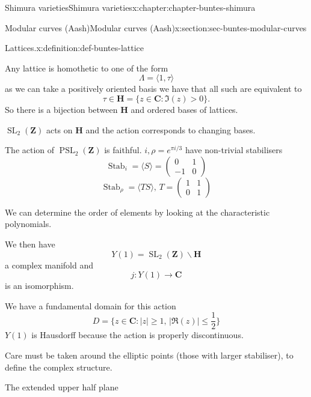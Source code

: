 \documentclass[oneside,10pt,]{book}
\numberwithin{equation}{section}
\newcommand{\ZZ}{\mathbf{Z}}
\newcommand{\CC}{\mathbf{C}}
\newcommand{\HH}{\mathbf{H}}
\DeclareMathOperator{\Stab}{Stab}
\DeclareMathOperator{\SL}{SL}
\DeclareMathOperator{\PSL}{PSL}
\newcommand{\gt}{>}
\newcommand{\amp}{&}
\begin{document}
\begin{chapterptx}{Shimura varieties}{}{Shimura varieties}{}{}{x:chapter:chapter-buntes-shimura}
\begin{sectionptx}{Modular curves (Aash)}{}{Modular curves (Aash)}{}{}{x:section:sec-buntes-modular-curves}
\begin{definition}{Lattices.}{x:definition:def-buntes-lattice}
\end{definition}
Any lattice is homothetic to one of the form%
\begin{equation*}
\Lambda = \langle 1 , \tau \rangle
\end{equation*}
as we can take a positively oriented basis we have that all such are equivalent to%
\begin{equation*}
\tau \in \HH = \{ z\in \CC: \Im(z) \gt 0 \}\text{.}
\end{equation*}
So there is a bijection between \(\HH\) and ordered bases of lattices.%
\par
\(\SL_2(\ZZ)\) acts on \(\HH\) and the action corresponds to changing bases.%
\par
The action of \(\PSL_2(\ZZ)\) is faithful. \(i,\rho = e^{\pi i /3}\) have non-trivial stabilisers%
\begin{equation*}
\Stab_i =  \langle S\rangle = \begin{pmatrix} 0\amp1 \\ -1 \amp 0 \end{pmatrix}
\end{equation*}
%
\begin{equation*}
\Stab_\rho =  \langle TS\rangle,\,T = \begin{pmatrix} 1\amp1 \\ 0 \amp 1 \end{pmatrix}
\end{equation*}
%
\par
We can determine the order of elements by looking at the characteristic polynomials.%
\par
We then have%
\begin{equation*}
Y(1) =\SL_2(\ZZ) \backslash \HH
\end{equation*}
a complex manifold and%
\begin{equation*}
j\colon Y(1) \to \CC
\end{equation*}
is an isomorphism.%
\par
We have a fundamental domain for this action%
\begin{equation*}
D = \{ z\in \CC : |z|  \ge 1,\, |\Re(z)| \le \frac 12 \}
\end{equation*}
\(Y(1)\) is Hausdorff because the action is properly discontinuous.%
\par
Care must be taken around the elliptic points (those with larger stabiliser), to define the complex structure.%
\par
The extended upper half plane%
\begin{equation*}

\end{equation*}
\end{sectionptx}
\end{chapterptx}
\end{document}
